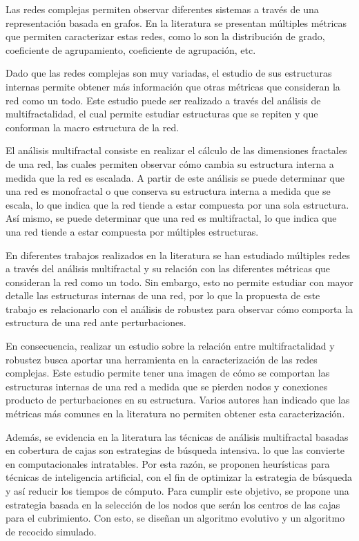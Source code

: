 Las redes complejas permiten observar diferentes sistemas a través de una representación basada en grafos. En la literatura se presentan múltiples métricas que permiten caracterizar estas redes, como lo son la distribución de grado, coeficiente de agrupamiento, coeficiente de agrupación, etc. 

Dado que las redes complejas son muy variadas, el estudio de sus estructuras internas permite obtener más información que otras métricas que consideran la red como un todo. Este estudio puede ser realizado a través del análisis de multifractalidad, el cual permite estudiar estructuras que se repiten y que conforman la macro estructura de la red.

El análisis multifractal consiste en realizar el cálculo de las dimensiones fractales de una red, las cuales permiten observar cómo cambia su estructura interna a medida que la red es escalada. A partir de este análisis se puede determinar que una red es monofractal o que conserva su estructura interna a medida que se escala, lo que indica que la red tiende a estar compuesta por una sola estructura. Así mismo, se puede determinar que una red es multifractal, lo que indica que una red tiende a estar compuesta por múltiples estructuras.

En diferentes trabajos realizados en la literatura se han estudiado múltiples redes a través del análisis multifractal y su relación con las diferentes métricas que consideran la red como un todo. Sin embargo, esto no permite estudiar con mayor detalle las estructuras internas de una red, por lo que la propuesta de este trabajo es relacionarlo con el análisis de robustez para observar cómo comporta la estructura de una red ante perturbaciones. 

En consecuencia, realizar un estudio sobre la relación entre multifractalidad y robustez busca aportar una herramienta en la caracterización de las redes complejas. Este estudio permite tener una imagen de cómo se comportan las estructuras internas de una red a medida que se pierden nodos y conexiones producto de perturbaciones en su estructura. Varios autores han indicado que las métricas más comunes en la literatura no permiten obtener esta caracterización.

Además, se evidencia en la literatura las técnicas de análisis multifractal basadas en cobertura de cajas son estrategias de búsqueda intensiva. lo que las convierte en computacionales intratables. Por esta razón, se proponen heurísticas para técnicas de inteligencia artificial, con el fin de optimizar la estrategia de búsqueda y así reducir los tiempos de cómputo. Para cumplir este objetivo, se propone una estrategia basada en la selección de los nodos que serán los centros de las cajas para el cubrimiento. Con esto, se diseñan un algoritmo evolutivo y un algoritmo de recocido simulado.

